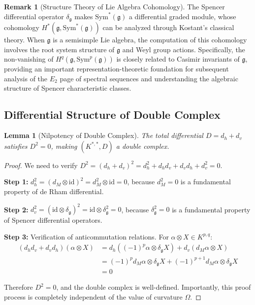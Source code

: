 \documentclass[a4paper,12pt]{extarticle}
\newtheorem{lemma}[theorem]{Lemma}
\theoremstyle{definition}
\newtheorem{remark}{Remark}
\begin{document}
\begin{remark}[Structure Theory of Lie Algebra Cohomology]
The Spencer differential operator $\delta_\mathfrak{g}$ makes $\text{Sym}^*(\mathfrak{g})$ a differential graded module, whose cohomology $H^*(\mathfrak{g}, \text{Sym}^*(\mathfrak{g}))$ can be analyzed through Kostant's classical theory. When $\mathfrak{g}$ is a semisimple Lie algebra, the computation of this cohomology involves the root system structure of $\mathfrak{g}$ and Weyl group actions. Specifically, the non-vanishing of $H^q(\mathfrak{g}, \text{Sym}^p(\mathfrak{g}))$ is closely related to Casimir invariants of $\mathfrak{g}$, providing an important representation-theoretic foundation for subsequent analysis of the $E_2$ page of spectral sequences and understanding the algebraic structure of Spencer characteristic classes.
\end{remark}

\subsection{Differential Structure of Double Complex}

\begin{lemma}[Nilpotency of Double Complex]
The total differential $D = d_h + d_v$ satisfies $D^2 = 0$, making $(K^{*,*}, D)$ a double complex.
\end{lemma}

\begin{proof}
We need to verify $D^2 = (d_h + d_v)^2 = d_h^2 + d_h d_v + d_v d_h + d_v^2 = 0$.

\textbf{Step 1:} $d_h^2 = (d_M \otimes \text{id})^2 = d_M^2 \otimes \text{id} = 0$, because $d_M^2 = 0$ is a fundamental property of de Rham differential.

\textbf{Step 2:} $d_v^2 = (\text{id} \otimes \delta_\mathfrak{g})^2 = \text{id} \otimes \delta_\mathfrak{g}^2 = 0$, because $\delta_\mathfrak{g}^2 = 0$ is a fundamental property of Spencer differential operators.

\textbf{Step 3:} Verification of anticommutation relations. For $\alpha \otimes X \in K^{p,q}$:
\begin{align}
(d_h d_v + d_v d_h)(\alpha \otimes X) &= d_h((-1)^p \alpha \otimes \delta_\mathfrak{g} X) + d_v(d_M \alpha \otimes X)\\
&= (-1)^p d_M \alpha \otimes \delta_\mathfrak{g} X + (-1)^{p+1} d_M \alpha \otimes \delta_\mathfrak{g} X\\
&= 0
\end{align}

Therefore $D^2 = 0$, and the double complex is well-defined. Importantly, this proof process is completely independent of the value of curvature $\Omega$.
\end{proof}
\end{document}
